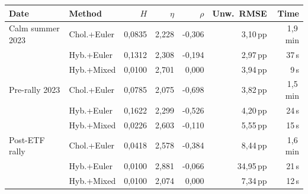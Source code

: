 \begin{tabular}{l l r r r r r}
  \toprule
  \textbf{Date} & \textbf{Method} & \textbf{$H$} & \textbf{$\eta$} & \textbf{$\rho$} & \textbf{Unw.\ RMSE} & \textbf{Time} \\
  \midrule
  Calm summer 2023 & Chol.+Euler & 0,0835 & 2,228 & -0,306 & 3,10\,pp & 1,9\,min \\
   & Hyb.+Euler & 0,1312 & 2,308 & -0,194 & 2,97\,pp & 37\,s \\
   & Hyb.+Mixed & 0,0100 & 2,701 & 0,000 & 3,94\,pp & 9\,s \\
  \addlinespace[3pt]
  Pre-rally 2023 & Chol.+Euler & 0,0785 & 2,075 & -0,698 & 3,82\,pp & 1,5\,min \\
   & Hyb.+Euler & 0,1622 & 2,299 & -0,526 & 4,20\,pp & 24\,s \\
   & Hyb.+Mixed & 0,0226 & 2,603 & -0,110 & 5,55\,pp & 15\,s \\
  \addlinespace[3pt]
  Post-ETF rally & Chol.+Euler & 0,0418 & 2,578 & -0,384 & 8,44\,pp & 1,6\,min \\
   & Hyb.+Euler & 0,0100 & 2,881 & -0,066 & 34,95\,pp & 21\,s \\
   & Hyb.+Mixed & 0,0100 & 2,074 & 0,000 & 7,34\,pp & 12\,s \\
  \bottomrule
\end{tabular}